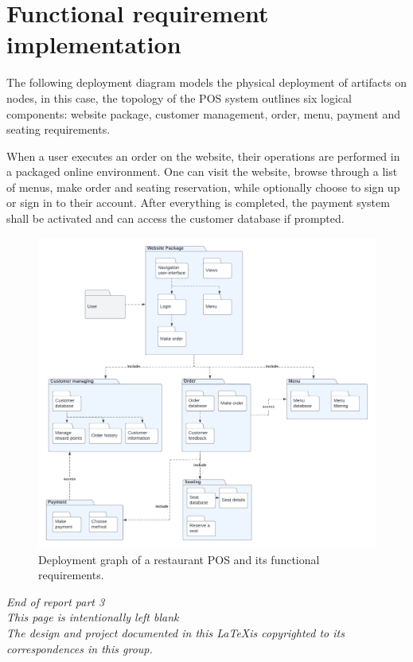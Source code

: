 \documentclass[12pt, a4paper]{article}
\theoremstyle{styleth}
\theoremstyle{styledef}
\begin{document}
\section{Functional requirement implementation} 

The following deployment diagram models the physical deployment of artifacts on nodes, in this case, the topology of the POS system outlines six logical components: website package, customer management, order, menu, payment and seating requirements.

\vspace{5mm}
When a user executes an order on the website, their operations are performed in a packaged online environment. One can visit the website, browse through a list of menus, make order and seating reservation, while optionally choose to sign up or sign in to their account. After everything is completed, the payment system shall be activated and can access the customer database if prompted.

\begin{figure}
	\centering
	\includegraphics[width=18cm]{functrq.png}
	\caption{Deployment graph of a restaurant POS and its functional requirements.}
	\label{fig:reqdiag}
\end{figure}

\newpage
\thispagestyle{empty}
\vspace*{\fill}
\centering
\textit{End of report part 3}\\
\textit{This page is intentionally left blank} \\
\textit{The design and project documented in this \LaTeX is copyrighted to its correspondences in this group.}
\end{document}
